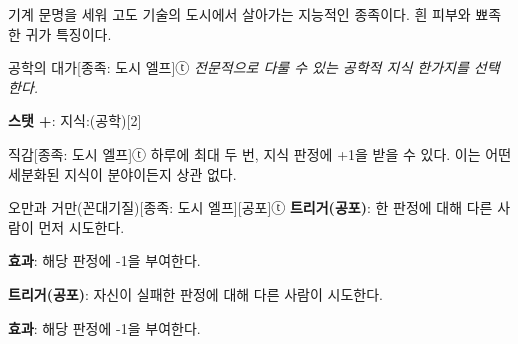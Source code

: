 \documentclass{report}
\begin{document}
	기계 문명을 세워 고도 기술의 도시에서 살아가는 지능적인 종족이다. 흰 피부와 뾰족한 귀가 특징이다.
	
	\begin{story}{공학의 대가}{[종족: 도시 엘프]ⓣ}
		\textit{전문적으로 다룰 수 있는 공학적 지식 한가지를 선택한다.}
		
		\textbf{스탯 +}: 지식:(공학)[2]
		
	\end{story}
	
	\begin{story}{직감}{[종족: 도시 엘프]ⓣ}
		하루에 최대 두 번, 지식 판정에 +1을 받을 수 있다. 이는 어떤 세분화된 지식이 분야이든지 상관 없다.
		
	\end{story}
	
	\begin{story}{오만과 거만(꼰대기질)}{[종족: 도시 엘프][공포]ⓣ}
		\textbf{트리거(공포)}: 한 판정에 대해 다른 사람이 먼저 시도한다.
		
		\textbf{효과}: 해당 판정에 -1을 부여한다.
		
		\medskip
		
		\textbf{트리거(공포)}: 자신이 실패한 판정에 대해 다른 사람이 시도한다.
		
		\textbf{효과}: 해당 판정에 -1을 부여한다.
		
	\end{story}
\end{document}
